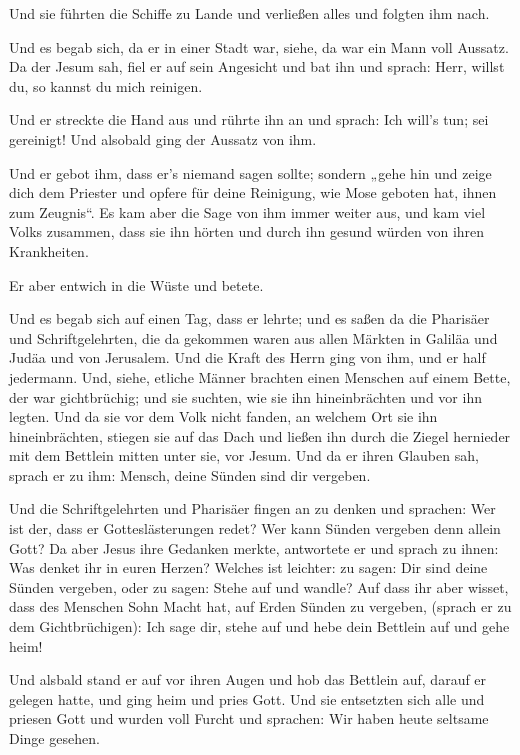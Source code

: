  Und sie führten die Schiffe zu Lande und verließen alles
und folgten ihm nach.

 Und es begab sich, da er in einer Stadt war, siehe, da
war ein Mann voll Aussatz. Da der Jesum sah, fiel er auf sein Angesicht
und bat ihn und sprach: Herr, willst du, so kannst du mich reinigen.

 Und er streckte die Hand aus und rührte ihn an und
sprach: Ich will's tun; sei gereinigt! Und alsobald ging der Aussatz von
ihm.

 Und er gebot ihm, dass er's niemand sagen sollte;
sondern „gehe hin und zeige dich dem Priester und opfere für deine
Reinigung, wie Mose geboten hat, ihnen zum Zeugnis``.  Es
kam aber die Sage von ihm immer weiter aus, und kam viel Volks zusammen,
dass sie ihn hörten und durch ihn gesund würden von ihren Krankheiten.

 Er aber entwich in die Wüste und betete.

 Und es begab sich auf einen Tag, dass er lehrte; und es
saßen da die Pharisäer und Schriftgelehrten, die da gekommen waren aus
allen Märkten in Galiläa und Judäa und von Jerusalem. Und die Kraft des
Herrn ging von ihm, und er half jedermann.  Und, siehe,
etliche Männer brachten einen Menschen auf einem Bette, der war
gichtbrüchig; und sie suchten, wie sie ihn hineinbrächten und vor ihn
legten.  Und da sie vor dem Volk nicht fanden, an welchem
Ort sie ihn hineinbrächten, stiegen sie auf das Dach und ließen ihn
durch die Ziegel hernieder mit dem Bettlein mitten unter sie, vor Jesum.
 Und da er ihren Glauben sah, sprach er zu ihm: Mensch,
deine Sünden sind dir vergeben.

 Und die Schriftgelehrten und Pharisäer fingen an zu
denken und sprachen: Wer ist der, dass er Gotteslästerungen redet? Wer
kann Sünden vergeben denn allein Gott?  Da aber Jesus
ihre Gedanken merkte, antwortete er und sprach zu ihnen: Was denket ihr
in euren Herzen?  Welches ist leichter: zu sagen: Dir
sind deine Sünden vergeben, oder zu sagen: Stehe auf und wandle?
 Auf dass ihr aber wisset, dass des Menschen Sohn Macht
hat, auf Erden Sünden zu vergeben, (sprach er zu dem Gichtbrüchigen):
Ich sage dir, stehe auf und hebe dein Bettlein auf und gehe heim!

 Und alsbald stand er auf vor ihren Augen und hob das
Bettlein auf, darauf er gelegen hatte, und ging heim und pries Gott.
 Und sie entsetzten sich alle und priesen Gott und wurden
voll Furcht und sprachen: Wir haben heute seltsame Dinge gesehen.

